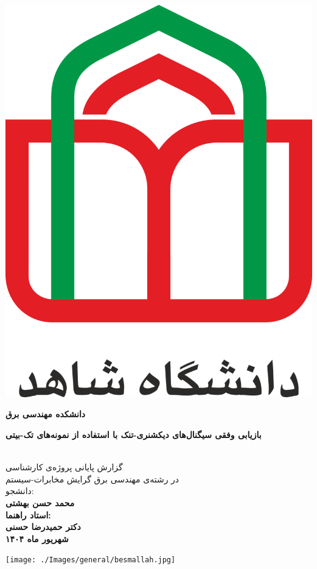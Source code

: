 
\thispagestyle{empty}
\vspace*{-28mm}
\centerline{\includegraphics[scale=0.5]{./Images/general/logo.png}}
\begin{center}
\vspace{-1mm}
\textbf{دانشکده مهندسی برق}
\\[3cm]
\begin{Huge}
\textbf{
بازیابی وفقی سیگنال‌های دیکشنری-تنک با استفاده از نمونه‌های تک-بیتی
}
\end{Huge}
\\[1.5cm]
\Large
گزارش پایانی پروژه‌ی کارشناسی
\\[0.5cm]
در رشته‌ی مهندسی برق گرایش مخابرات-سیستم
\\[1cm]
دانشجو:
\\[0.5cm]
\textbf{
محمد حسن بهشتی    
\\[1cm]
استاد راهنما:
\\[0.5cm]
دکتر حمیدرضا حسنی
\\[1cm]
شهریور ماه ۱۴۰۴
}
\end{center}
\newpage
\thispagestyle{empty}
\centerline{\texttt{[image: ./Images/general/besmallah.jpg]}}